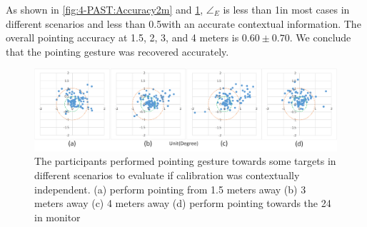 As shown in \figurename{ \ref{fig:4-PAST:Accuracy2m}} and \figurename{ \ref{fig:4-PAST:Accuracy}}, ${\angle}_{E}$ is less than 1\degree in most cases in different scenarios and less than 0.5\degree with an accurate contextual information. The overall pointing accuracy at 1.5, 2, 3, and 4 meters is $0.60\pm0.70$\degree. We conclude that the pointing gesture was recovered accurately.
\begin{figure} [htb]
	\centering
	\includegraphics[width=\linewidth]{figures/4-PAST/accuracy.png}
	\caption{The participants performed pointing gesture towards some targets in different scenarios to evaluate if calibration was contextually independent. (a) perform pointing from 1.5 meters away (b) 3 meters away (c) 4 meters away (d) perform pointing towards the 24 in monitor }
	\label{fig:4-PAST:Accuracy}
\end{figure}


